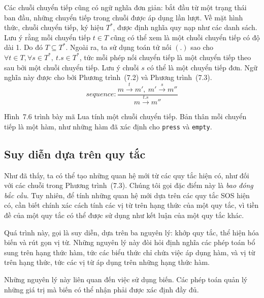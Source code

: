 Các chuỗi chuyển tiếp cũng có ngữ nghĩa đơn giản: bắt đầu từ một trạng thái ban đầu, những chuyển tiếp trong chuỗi được áp dụng lần lượt. Về mặt hình thức, chuỗi chuyển tiếp, ký hiệu $T^*$, được định nghĩa quy nạp như các danh sách. Lưu ý rằng mỗi chuyển tiếp $t\in T$ cũng có thể xem là một chuỗi chuyển tiếp có độ dài 1. Do đó $T\subseteq T^*$. Ngoài ra, ta sử dụng toán tử nối $(.)$ sao cho $\forall t\in T,\forall s\in T^*,\ t.s\in T^*$, tức mỗi phép nối chuyển tiếp là một chuyển tiếp theo sau bởi một chuỗi chuyển tiếp. Lưu ý chuỗi $s$ có thể là một chuyển tiếp đơn. Ngữ nghĩa này được cho bởi Phương trình~(7.2) và Phương trình~(7.3).
\begin{equation}
sequence:\frac{m\xrightarrow{t}m',\ m'\xrightarrow{s}m''}{m\xrightarrow{t.s}m''}\tag{7.3}
\end{equation}

Hình~7.6 trình bày mã Lua tính một chuỗi chuyển tiếp. Bản thân mỗi chuyển tiếp là một hàm, như những hàm đã xác định cho \texttt{press} và \texttt{empty}.

\subsection{Suy diễn dựa trên quy tắc}
Như đã thấy, ta có thể tạo những quan hệ mới từ các quy tắc hiện có, như đối với các chuỗi trong Phương trình~(7.3). Chúng tôi gọi đặc điểm này là \emph{bao đóng bắc cầu}. Tuy nhiên, để tính những quan hệ mới dựa trên các quy tắc SOS hiện có, cần biết chính xác cách tính các vị từ trên hạng thức của một quy tắc, vì tiền đề của một quy tắc có thể được sử dụng như kết luận của một quy tắc khác.

Quá trình này, gọi là suy diễn, dựa trên ba nguyên lý: khớp quy tắc, thể hiện hóa biến và rút gọn vị từ. Những nguyên lý này đòi hỏi định nghĩa các phép toán bổ sung trên hạng thức hàm, tức các biểu thức chỉ chứa việc áp dụng hàm, và vị từ trên hạng thức, tức các vị từ áp dụng trên những hạng thức hàm.

Những nguyên lý này liên quan đến việc sử dụng biến. Các phép toán quản lý những giá trị mà biến có thể nhận phải được xác định đầy đủ.

